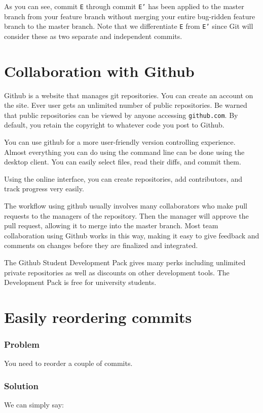 \documentclass[12pt]{report}
\newcommand\code[1]{{\color{blue}\texttt{#1}}}
\begin{document}
As you can see, commit \texttt{E} through commit \texttt{E'} has been applied to the master branch from your feature branch without merging your entire bug-ridden feature branch to the master branch.  Note that we differentiate \texttt{E} from \texttt{E'} since Git will consider these as two separate and independent commits.

\section{Collaboration with Github}

Github is a website that manages git repositories. You can create an account on the site. Ever user gets an unlimited number of public repositories. Be warned that public repositories can be viewed by anyone accessing \code{github.com}. By default, you retain the copyright to whatever code you post to Github.

You can use github for a more user-friendly version controlling experience.  Almost everything you can do using the command line can be done using the desktop client.  You can easily select files, read their diffs, and commit them.
 
Using the online interface, you can create repositories, add contributors, and track progress very easily.

The workflow using github usually involves many collaborators who make pull requests to the managers of the repository.  Then the manager will approve the pull request, allowing it to merge into the master branch.  Most team collaboration using Github works in this way, making it easy to give feedback and comments on changes before they are finalized and integrated.

The Github Student Development Pack gives many perks including unlimited private repositories as well as discounts on other development tools.  The Development Pack is free for university students.

\section{Easily reordering commits}

\subsubsection*{Problem}
You need to reorder a couple of commits.
\subsubsection*{Solution}
We can simply say:
\end{document}
